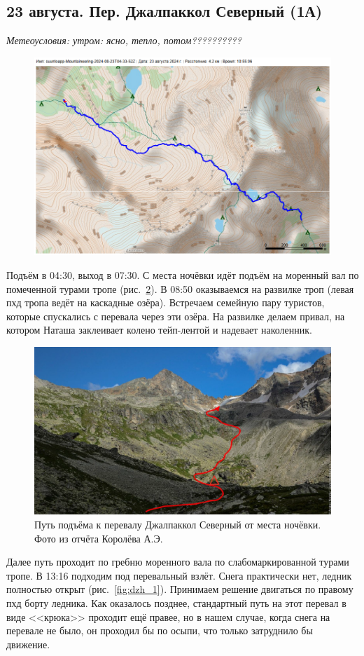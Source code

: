 \subsection{23 августа.  Пер. Джалпаккол Северный (1А)}
\textit{Метеоусловия: утром: ясно, тепло, потом??????????}

\begin{figure}[h!]
	\centering
	\includegraphics[angle=0, width=0.7\linewidth]{../pics/mini_maps/23}
	\label{fig:mini_23}
\end{figure}


Подъём в 04:30, выход в 07:30. С места ночёвки идёт подъём на моренный вал по помеченной турами тропе (рис.~\ref{fig:23augstart}). В 08:50 оказываемся на развилке троп (левая пхд тропа ведёт на каскадные озёра). Встречаем семейную пару туристов, которые спускались с перевала через эти озёра. На развилке делаем привал, на котором Наташа заклеивает колено тейп-лентой и надевает наколенник.

\begin{figure}[h!]
	\centering
	\includegraphics[angle=0, width=0.7\linewidth]{../pics/23augstart}
	\caption{Путь подъёма к перевалу Джалпаккол Северный от места ночёвки. Фото из отчёта Королёва А.Э. \cite{Korolyov2018}}
	\label{fig:23augstart}
\end{figure}

 Далее путь проходит по гребню моренного вала по слабомаркированной турами тропе. В 13:16 подходим под перевальный взлёт. Снега практически нет, ледник полностью открыт (рис.~\ref{fig:dzh_1}). Принимаем решение двигаться по правому пхд борту ледника. Как оказалось позднее, стандартный путь на этот перевал в виде <<крюка>> проходит ещё правее, но в нашем случае, когда снега на перевале не было, он проходил бы по осыпи, что только затруднило бы движение.
 



